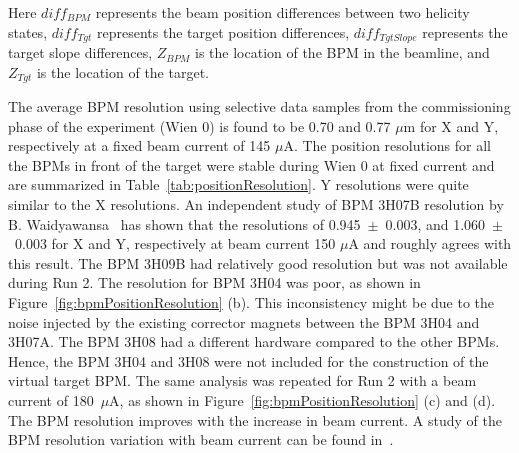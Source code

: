 Here $diff_{BPM}$ represents the beam position differences between two helicity states, $diff_{Tgt}$ represents the target position differences, $diff_{TgtSlope}$ represents the target slope differences, $Z_{BPM}$ is the location of the BPM in the beamline, and $Z_{Tgt}$ is the location of the target.

The average BPM resolution using selective data samples from the commissioning phase of the experiment (Wien 0) is found to be 0.70	and 0.77 $\mu$m for X and Y, respectively at a fixed beam current of 145 $\mu$A. 
The position resolutions for all the BPMs in front of the target were stable during Wien 0 at fixed current and are summarized in Table~\ref{tab:positionResolution}. Y resolutions were quite similar to the X resolutions. 
An independent study of BPM 3H07B resolution by B. Waidyawansa~\cite{buddhini_resolution} has shown that the resolutions of 0.945~$\pm$~0.003, and 1.060~$\pm$~0.003 for X and Y, respectively at beam current 150 $\mu$A and roughly agrees with this result.
The BPM 3H09B had relatively good resolution but was not available during Run 2. The resolution for BPM 3H04 was poor, as shown in Figure~\ref{fig:bpmPositionResolution} (b). This inconsistency might be due to the noise injected by the existing corrector magnets between the BPM 3H04 and 3H07A. 
The BPM 3H08 had a different hardware compared to the other BPMs. Hence, the BPM 3H04 and 3H08 were not included for the construction of the virtual target BPM. 
The same analysis was repeated for Run 2 with a beam current of 180~$\mu$A, as shown in Figure~\ref{fig:bpmPositionResolution} (c) and (d). The BPM resolution improves with the increase in beam current. A study of the BPM resolution variation with beam current can be found in~\cite{buddhini_resolution}.

